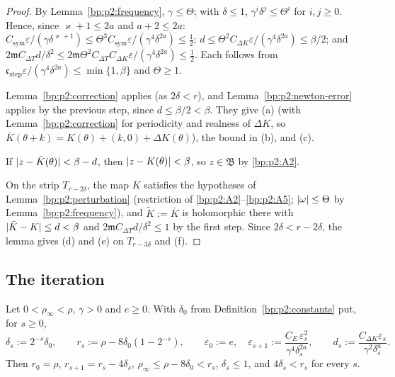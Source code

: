 \begin{proof}
\label{step:p2:st-small}
By Lemma~\ref{bp:p2:frequency}, $\gamma\le\Theta$; with $\delta\le1$, $\gamma^i\delta^j\le\Theta^i$ for
$i,j\ge0$. Hence, since $\varkappa+1\le2a$ and $a+2\le2a$:
$C_{\mathrm{sym}}\varepsilon/(\gamma\delta^{\varkappa+1})\le\Theta^3C_{\mathrm{sym}}\varepsilon/(\gamma^4
\delta^{2a})\le\frac12$; $d\le\Theta^2C_{\Delta K}\varepsilon/(\gamma^4\delta^{2a})\le\beta/2$; and
$2\mathfrak mC_{\Delta T}d/\delta^2\le2\mathfrak m\Theta^2C_{\Delta T}C_{\Delta K}\varepsilon/(\gamma^4
\delta^{2a})\le\frac12$. Each follows from $\mathfrak c_{\mathrm{step}}\varepsilon/(\gamma^4\delta^{2a})\le
\min\{1,\beta\}$ and $\Theta\ge1$.

\label{step:p2:st-error}
Lemma~\ref{bp:p2:correction} applies (as $2\delta<r$), and Lemma~\ref{bp:p2:newton-error} applies by the
previous step, since $d\le\beta/2<\beta$. They give (a) (with Lemma~\ref{bp:p2:correction} for
periodicity and realness of $\Delta K$, so $\bar K(\theta+k)=K(\theta)+(k,0)+\Delta K(\theta)$), the
bound in (b), and (c).

\label{step:p2:st-ball}
If $\lvert z-\bar K(\theta)\rvert<\beta-d$, then $\lvert z-K(\theta)\rvert<\beta$, so $z\in\mathfrak B$ by \ref{bp:p2:A2}.

\label{step:p2:st-perturb}
On the strip $T_{r-2\delta}$, the map $K$ satisfies the hypotheses of Lemma~\ref{bp:p2:perturbation} (restriction of
\ref{bp:p2:A2}--\ref{bp:p2:A5}; $\lvert \omega\rvert\le\Theta$ by Lemma~\ref{bp:p2:frequency}), and $\tilde K:=\bar
K$ is holomorphic there with $\lvert \bar K-K\rvert\le d<\beta$ and $2\mathfrak mC_{\Delta T}d/\delta^2\le1$ by
the first step. Since $2\delta<r-2\delta$, the lemma gives (d) and (e) on $T_{r-3\delta}$ and (f).
\end{proof}

\subsection{The iteration}\label{bp:p2:sec-iteration}

\begin{definition}\label{bp:p2:schedule}
Let $0<\rho_\infty<\rho$, $\gamma>0$ and $e\ge0$. With $\delta_0$ from
Definition~\ref{bp:p2:constants} put, for $s\ge0$,
\[
\delta_s:=2^{-s}\delta_0,\qquad r_s:=\rho-8\delta_0(1-2^{-s}),\qquad\varepsilon_0:=e,\quad
\varepsilon_{s+1}:=\frac{C_E\,\varepsilon_s^2}{\gamma^4\delta_s^{2a}},\qquad
d_s:=\frac{C_{\Delta K}\varepsilon_s}{\gamma^2\delta_s^a}.
\]
Then $r_0=\rho$, $r_{s+1}=r_s-4\delta_s$, $\rho_\infty\le\rho-8\delta_0<r_s$, $\delta_s\le1$, and
$4\delta_s<r_s$ for every $s$.
\end{definition}

